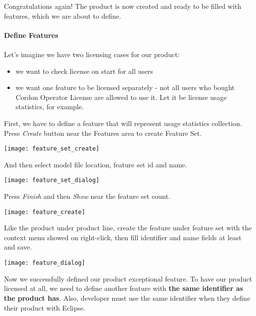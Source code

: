 \documentclass[12pt]{report}
\begin{document}
Congratulations again! The product is now created and ready to be filled with features, which we are about to define. 

\paragraph*{Define Features}
\paragraph*{}

Let's imagine we have two licensing cases for our product:
\begin{itemize}
    \item we want to check license on start for all users
    \item we want one feature to be licensed separately - not all users who bought Cordon Operator License are allowed to use it. Let it be license usage statistics, for example.
\end{itemize}

First, we have to define a feature that will represent usage statistics collection. Press \textit{Create} button near the Features area to create Feature Set.

\begin{center}
    \texttt{[image: feature\_set\_create]}
\end{center}

And then select model file location, feature set id and name.

\begin{center}
    \texttt{[image: feature\_set\_dialog]}
\end{center}

Press \textit{Finish} and then \textit{Show} near the feature set count.

\begin{center}
    \texttt{[image: feature\_create]}
\end{center}

Like the product under product line, create the feature under feature set with the context menu showed on right-click, then fill identifier and name fields at least and save.

\begin{center}
    \texttt{[image: feature\_dialog]}
\end{center}

Now we successfully defined our product exceptional feature. To have our product licensed at all, we need to define another feature with \textbf{the same identifier as the product has}.
Also, developer must use the same identifier when they define their product with Eclipse.
\end{document}
